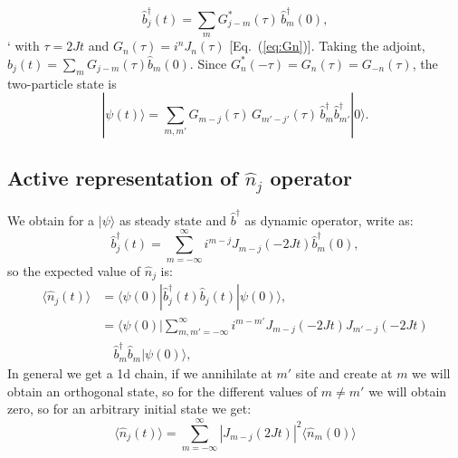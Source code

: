 \begin{equation} 
\hat{b}_j^\dagger(t)=\sum_{m}G^*_{j-m}(\tau)\,\hat b_m^\dagger(0),
\end{equation} `
with $\tau=2Jt$ and $G_n(\tau)=i^nJ_n(\tau)$ [Eq.~(\ref{eq:Gn})]. Taking the adjoint, $\hat b_j(t)=\sum_mG_{j-m}(\tau)\hat b_m(0)$. Since $G_n^*(-\tau)=G_n(\tau)=G_{-n}(\tau)$, the two-particle state is
\begin{equation}
|\psi(t)\rangle=\sum_{m,m'}G_{m-j}(\tau)\,G_{m'-j'}(\tau)\,\hat b_m^\dagger\hat b_{m'}^\dagger|0\rangle .
\end{equation}

\subsection{Active representation of $\hat{n}_j$ operator} 
We obtain for a $|\psi\rangle$ as steady state and $\hat{b}^\dagger$ as dynamic operator, write as: 
\begin{equation} 
\hat{b}_j^\dagger(t) = \sum_{m=-\infty}^\infty i^{m-j} J_{m-j}(-2Jt) \hat{b}_m^\dagger(0), 
\end{equation} 
so the expected value of $\hat{n}_j$ is: 
\begin{equation}
\begin{split}
    \langle \hat{n}_j (t) \rangle &= \langle \psi(0)| \hat{b}_j^\dagger(t) \hat{b}_j (t) | \psi(0) \rangle, \\
         &= \langle \psi(0)| \sum_{m,m'=-\infty}^\infty i^{m-m'} J_{m-j}(-2Jt) J_{m'-j} (-2Jt) \\
         &\quad \hat{b}_m^\dagger   \hat{b}_m | \psi(0) \rangle,
\end{split}
\end{equation}
In general we get a 1d chain, if we annihilate at $m'$ site and create at $m$ we will obtain an orthogonal state, so for the different values of $m\neq m'$ we will obtain zero, so for an arbitrary initial state we get: 
\begin{equation} 
\langle \hat{n}_j (t) \rangle = \sum_{m=-\infty}^\infty |J_{m-j}(2Jt)|^2 \langle \hat{n}_m(0) \rangle
\end{equation} 
